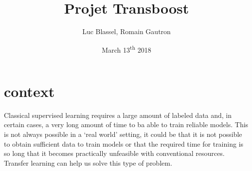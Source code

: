\documentclass[11 pt]{article}
\title{Projet Transboost}
\author{Luc Blassel, Romain Gautron}
\date{March 13\textsuperscript{th} 2018}
\begin{document}
\maketitle

\tableofcontents
\newpage

\section{context}
\paragraph{}Classical supervised learning requires a large amount of labeled data and, in certain cases, a very long amount of time to ba able to train reliable models. This is not always possible in a `real world' setting, it could be that it is not possible to obtain sufficient data to train models or that the required time for training is so long that it becomes practically unfeasible with conventional resources. Transfer learning can help us solve this type of problem. 

\end{document}
